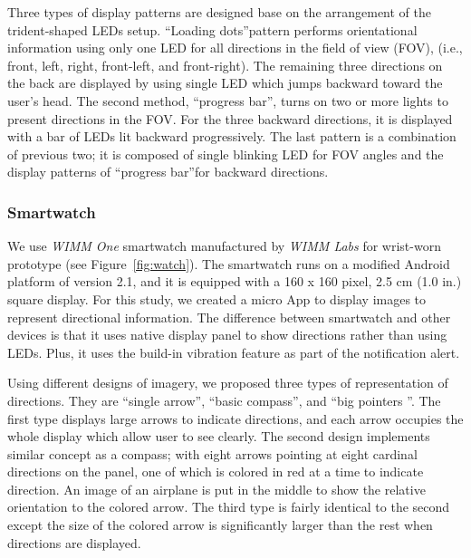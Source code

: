\documentclass{sigchi}
\begin{document}
Three types of display patterns are designed base on the arrangement of the trident-shaped LEDs setup. \textquotedblleft Loading dots\textquotedblright pattern performs orientational information using only one LED for all directions in the field of view (FOV), (i.e., front, left, right, front-left, and front-right). The remaining three directions on the back are displayed by using single LED which jumps backward toward the user's head. The second method, \textquotedblleft progress bar\textquotedblright, turns on two or more lights to present directions in the FOV. For the three backward directions, it is displayed with a bar of LEDs lit backward progressively. The last pattern is a combination of previous two; it is composed of single blinking LED for FOV angles and the display patterns of \textquotedblleft progress bar\textquotedblright for backward directions.

\subsubsection{Smartwatch}
We use \textit{WIMM One} smartwatch manufactured by \textit{WIMM Labs} for wrist-worn prototype (see Figure~\ref{fig:watch}). The smartwatch runs on a modified Android platform of version 2.1, and it is equipped with a 160 x 160 pixel, 2.5 cm (1.0 in.) square display. For this study, we created a micro App to display images to represent directional information. The difference between smartwatch and other devices is that it uses native display panel to show directions rather than using LEDs. Plus, it uses the build-in vibration feature as part of the notification alert.

Using different designs of imagery, we proposed three types of representation of directions. They are \textquotedblleft single arrow\textquotedblright, \textquotedblleft basic compass\textquotedblright, and \textquotedblleft big pointers \textquotedblright. The first type displays large arrows to indicate directions, and each arrow occupies the whole display which allow user to see clearly. The second design implements similar concept as a compass; with eight arrows pointing at eight cardinal directions on the panel, one of which is colored in red at a time   to indicate direction. An image of an airplane is put in the middle to show the relative orientation to the colored arrow. The third type is fairly identical to the second except the size of the colored arrow is significantly larger than the rest when directions are displayed.
\end{document}
